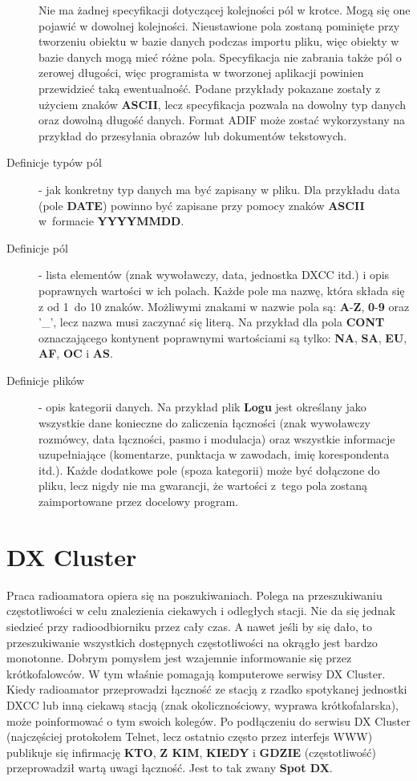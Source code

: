 \documentclass[]{mgr}
\begin{document}
\begin{description}
                Nie ma żadnej specyfikacji dotyczącej kolejności pól w krotce. Mogą się one pojawić w dowolnej kolejności. Nieustawione pola zostaną pominięte przy tworzeniu obiektu w bazie danych podczas importu pliku, więc obiekty w bazie danych mogą mieć różne pola. Specyfikacja nie zabrania także pól o zerowej długości, więc programista w tworzonej aplikacji powinien przewidzieć taką ewentualność. Podane przykłady pokazane zostały z użyciem znaków \textbf{ASCII}, lecz specyfikacja pozwala na dowolny typ danych oraz dowolną długość danych. Format ADIF może zostać wykorzystany na przykład do przesyłania obrazów lub dokumentów tekstowych. 
                \item[Definicje typów pól] - jak konkretny typ danych ma być zapisany w pliku. Dla przykładu data (pole \textbf{DATE}) powinno być zapisane przy pomocy znaków \textbf{ASCII} w~formacie \textbf{YYYYMMDD}.
                \item[Definicje pól] - lista elementów (znak wywoławczy, data, jednostka DXCC itd.) i opis poprawnych wartości w ich polach. Każde pole ma nazwę, która składa się z od 1~do 10 znaków. Możliwymi znakami w nazwie pola są: \textbf{A}-\textbf{Z}, \textbf{0}-\textbf{9} oraz '\_', lecz nazwa musi zaczynać się literą. Na przykład dla pola \textbf{CONT} oznaczającego kontynent poprawnymi wartościami są tylko: \textbf{NA}, \textbf{SA}, \textbf{EU}, \textbf{AF}, \textbf{OC} i \textbf{AS}.
                \item[Definicje plików] - opis kategorii danych. Na przykład plik \textbf{Logu} jest określany jako wszystkie dane konieczne do zaliczenia łączności (znak wywoławczy rozmówcy, data łączności, pasmo i modulacja) oraz wszystkie informacje uzupełniające (komentarze, punktacja w zawodach, imię korespondenta itd.). Każde dodatkowe pole (spoza kategorii) może być dołączone do pliku, lecz nigdy nie ma gwarancji, że wartości z~tego pola zostaną zaimportowane przez docelowy program.
            \end{description}

        \section{DX Cluster}
        Praca radioamatora opiera się na poszukiwaniach. Polega na przeszukiwaniu częstotliwości w celu znalezienia ciekawych i odległych stacji. Nie da się jednak siedzieć przy radioodbiorniku przez cały czas. A nawet jeśli by się dało, to przeszukiwanie wszystkich dostępnych częstotliwości na okrągło jest bardzo monotonne. Dobrym pomysłem jest wzajemnie informowanie się przez krótkofalowców. W tym właśnie pomagają komputerowe serwisy DX Cluster. Kiedy radioamator przeprowadzi łączność ze stacją z rzadko spotykanej jednostki DXCC lub inną ciekawą stacją (znak okolicznościowy, wyprawa krótkofalarska), może poinformować o tym swoich kolegów. Po podłączeniu do serwisu DX Cluster (najczęściej protokołem Telnet, lecz ostatnio często przez interfejs WWW) publikuje się infirmację \textbf{KTO}, \textbf{Z KIM}, \textbf{KIEDY} i \textbf{GDZIE} (częstotliwość) przeprowadził wartą uwagi łączność. Jest to tak zwany \textbf{Spot DX}. 
\end{document}
